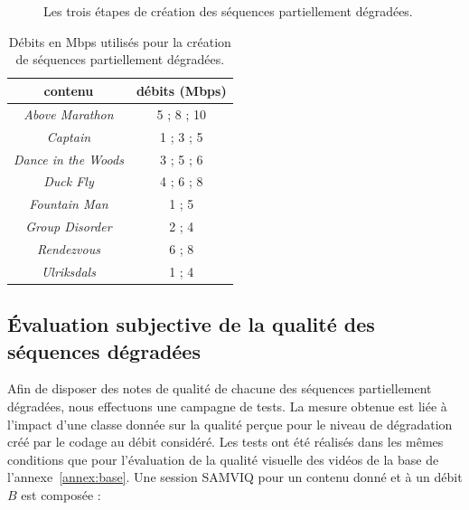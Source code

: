\begin{figure}[htbp]
\begin{tikzpicture}
	\end{tikzpicture}\\
	\\
	\caption{Les trois étapes de création des séquences partiellement dégradées.}
	\label{fig:etapesSeqPartDeg}
\end{figure}


\begin{table}[htbp]
\centering
\begin{tabular}{cc}\toprule
\textbf{contenu}						& \textbf{débits (Mbps)} \\ \toprule
\emph{Above Marathon}			& 5 ; 8 ; 10	\\\midrule
\emph{Captain	}						& 1 ; 3 ; 5		\\\midrule
\emph{Dance in the Woods}	& 3 ; 5 ; 6		\\\midrule
\emph{Duck Fly}						& 4 ; 6 ; 8		\\\midrule
\emph{Fountain Man}				& 1 ; 5			\\\midrule
\emph{Group Disorder}			& 2 ; 4			\\\midrule
\emph{Rendezvous}				& 6 ; 8			\\\midrule
\emph{Ulriksdals}					& 1 ; 4			\\\bottomrule
\end{tabular}
\caption{Débits en Mbps utilisés pour la création de séquences partiellement dégradées.}
\label{tab:debitsClasses}
\end{table}


\subsection{Évaluation subjective de la qualité des séquences dégradées}
Afin de disposer des notes de qualité de chacune des séquences partiellement dégradées, nous effectuons une campagne de tests. La mesure obtenue est liée à l'impact d'une classe donnée sur la qualité perçue pour le niveau de dégradation créé par le codage au débit considéré. Les tests ont été réalisés dans les mêmes conditions que pour l'évaluation de la qualité visuelle des vidéos de la base de l'annexe~\ref{annex:base}. Une session SAMVIQ pour un contenu donné et à un débit $B$ est composée :

